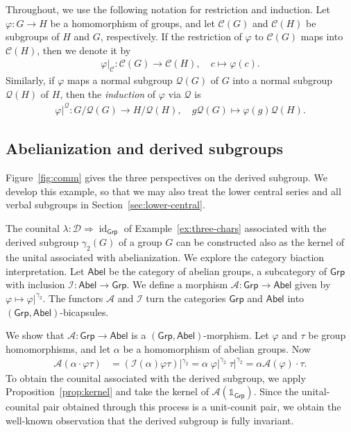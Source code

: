 \documentclass{amsart}
\newcommand{\Cat}[1]{\mathsf{#1}}
\newcommand{\cat}[1]{\Cat{#1}}
\newcommand{\acat}[1]{\mathsf{#1}}
\numberwithin{lstfloat}{section}
\DeclareMathOperator{\id}{id}
\newcommand{\one}{\mathbb{1}}
\newcommand{\func}[1]{\mathcal{#1}}
\theoremstyle{definition}
\theoremstyle{remark}
\numberwithin{equation}{section}
\begin{document}
Throughout, we use the following notation for restriction and induction. Let $\varphi : G \to H$ be a homomorphism of groups, and let
$\func{C}(G)$ and $\func{C}(H)$ be subgroups of $H$ and $G$, respectively. 
If the restriction of $\varphi$ to $\func{C}(G)$ maps into $\func{C}(H)$, 
then we denote it by 
\begin{align}\label{eqn:restriction} 
  \varphi|_{\func{C}} : \func{C}(G) \to \func{C}(H),\quad c\mapsto \varphi(c).
\end{align} 
Similarly, if $\varphi$ maps a normal subgroup  $\func{Q}(G)$ of $G$ into a normal subgroup $\func{Q}(H)$ of $H$, then the \emph{induction} of $\varphi$ via $\func{Q}$ is
\begin{align}\label{eqn:induction}
  \varphi|^{\func{Q}} : G/\func{Q}(G) \to H/\func{Q}(H),\quad g\func{Q}(G) \mapsto \varphi(g)\func{Q}(H).
\end{align}
  

\subsection{Abelianization and derived subgroups}\label{sec:abelianization}

Figure~\ref{fig:comm} gives the three perspectives on the derived subgroup. We
develop this example, so that we may also treat the lower central series 
and all verbal subgroups in Section~\ref{sec:lower-central}.

The counital $\lambda : \func{D}\Rightarrow \id_{\cat{Grp}}$ 
of Example~\ref{ex:three-chars}
associated with the derived subgroup $\gamma_2(G)$ of a group $G$ 
can be constructed also as the kernel of the unital 
associated with abelianization.
We explore the category biaction interpretation.
Let $\acat{Abel}$ be the category of abelian groups, a subcategory of
$\cat{Grp}$ with inclusion $\func{I} : \acat{Abel} \to \acat{Grp}$. We define a
morphism $\func{A} : \cat{Grp} \to \cat{Abel}$ given by $\varphi\mapsto
\varphi|^{\gamma_2}$. The functors $\func{A}$ and
$\func{I}$ turn the categories $\acat{Grp}$ and $\acat{Abel}$ into $(\acat{Grp},
\acat{Abel})$-bicapsules. 

We show that $\func{A}:\acat{Grp}\to\acat{Abel}$ is a $(\acat{Grp},
\acat{Abel})$-morphism. Let $\varphi$ and $\tau$ be group homomorphisms, and
let $\alpha$ be a homomorphism of abelian groups. Now 
\begin{align*}
  \func{A}(\alpha\cdot \varphi\tau) &= (\func{I}(\alpha)\varphi\tau)|^{\gamma_2} = \alpha\;\varphi|^{\gamma_2}\;  \tau|^{\gamma_2} =\alpha\func{A}(\varphi)\cdot \tau.
\end{align*}
To obtain the counital associated with the derived subgroup, we apply
Proposition~\ref{prop:kernel} and take the kernel of $\func{A}(\one_{\acat{Grp}})$. Since
the unital-counital pair obtained through this process is a unit-counit pair, 
 we
obtain the well-known observation that the derived subgroup is fully invariant.
\end{document}
